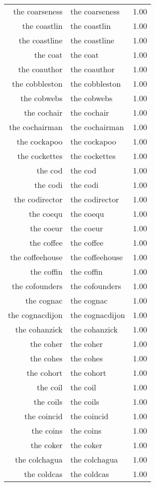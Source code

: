 \begin{table}[ht]
\begin{tabular}{rlr}
  the coarseness & the coarseness & 1.00 \\ 
  the coastlin & the coastlin & 1.00 \\ 
  the coastline & the coastline & 1.00 \\ 
  the coat & the coat & 1.00 \\ 
  the coauthor & the coauthor & 1.00 \\ 
  the cobbleston & the cobbleston & 1.00 \\ 
  the cobwebs & the cobwebs & 1.00 \\ 
  the cochair & the cochair & 1.00 \\ 
  the cochairman & the cochairman & 1.00 \\ 
  the cockapoo & the cockapoo & 1.00 \\ 
  the cockettes & the cockettes & 1.00 \\ 
  the cod & the cod & 1.00 \\ 
  the codi & the codi & 1.00 \\ 
  the codirector & the codirector & 1.00 \\ 
  the coequ & the coequ & 1.00 \\ 
  the coeur & the coeur & 1.00 \\ 
  the coffee & the coffee & 1.00 \\ 
  the coffeehouse & the coffeehouse & 1.00 \\ 
  the coffin & the coffin & 1.00 \\ 
  the cofounders & the cofounders & 1.00 \\ 
  the cognac & the cognac & 1.00 \\ 
  the cognacdijon & the cognacdijon & 1.00 \\ 
  the cohanzick & the cohanzick & 1.00 \\ 
  the coher & the coher & 1.00 \\ 
  the cohes & the cohes & 1.00 \\ 
  the cohort & the cohort & 1.00 \\ 
  the coil & the coil & 1.00 \\ 
  the coils & the coils & 1.00 \\ 
  the coincid & the coincid & 1.00 \\ 
  the coins & the coins & 1.00 \\ 
  the coker & the coker & 1.00 \\ 
  the colchagua & the colchagua & 1.00 \\ 
  the coldcas & the coldcas & 1.00 \\ 

\end{tabular}
\end{table}
